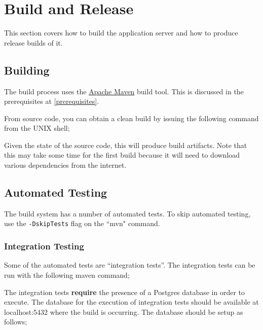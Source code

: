 
\section{Build and Release}
\label{buildandrelease}

This section covers how to build the application server and how to produce release builds of it.

\subsection{Building}

The build process uses the \href{http://maven.apache.org}{Apache Maven} build tool.  This is discussed in the prerequisites at \ref{prerequisites}.

From source code, you can obtain a clean build by issuing the following command from the UNIX shell;


Given the state of the source code, this will produce build artifacts.  Note that this may take some time for the first build because it will need to download various dependencies from the internet.

\subsection{Automated Testing}

The build system has a number of automated tests.  To skip automated testing, use the {\tt -DskipTests} flag on the ``mvn" command.

\subsubsection{Integration Testing}
\label{integrationtesting}

Some of the automated tests are ``integration tests''.  The integration tests can be run with the following maven command;


The integration tests {\bf require} the presence of a Postgres database in order to execute.  The database for the execution of integration tests should be available at localhost:5432 where the build is occurring.  The database should be setup as follows;

